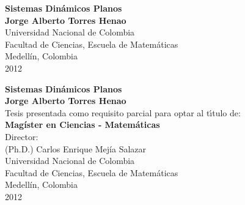 \begin{center}
\begin{figure}
\centering
{}
\end{figure}
\thispagestyle{empty} \vspace*{2.0cm} \textbf{\huge
Sistemas Dinámicos Planos}\\[6.0cm]
\Large\textbf{Jorge Alberto Torres Henao}\\[6.0cm]
\small Universidad Nacional de Colombia\\
Facultad de Ciencias, Escuela de Matemáticas\\
Medellín, Colombia\\
2012\\
\end{center}

\newpage{\pagestyle{empty}\cleardoublepage}

\newpage
\begin{center}
\thispagestyle{empty} \vspace*{0cm} \textbf{\huge
Sistemas Dinámicos Planos}\\[3.0cm]
\Large\textbf{Jorge Alberto Torres Henao}\\[3.0cm]
\small Tesis presentada como requisito parcial para optar al
t\'{\i}tulo de:\\
\textbf{Magíster en Ciencias - Matemáticas}\\[2.5cm]
Director:\\
(Ph.D.) Carlos Enrique Mejía Salazar\\[4.5cm]
Universidad Nacional de Colombia\\
Facultad de Ciencias, Escuela de Matemáticas\\
Medellín, Colombia\\
2012\\
\end{center}

